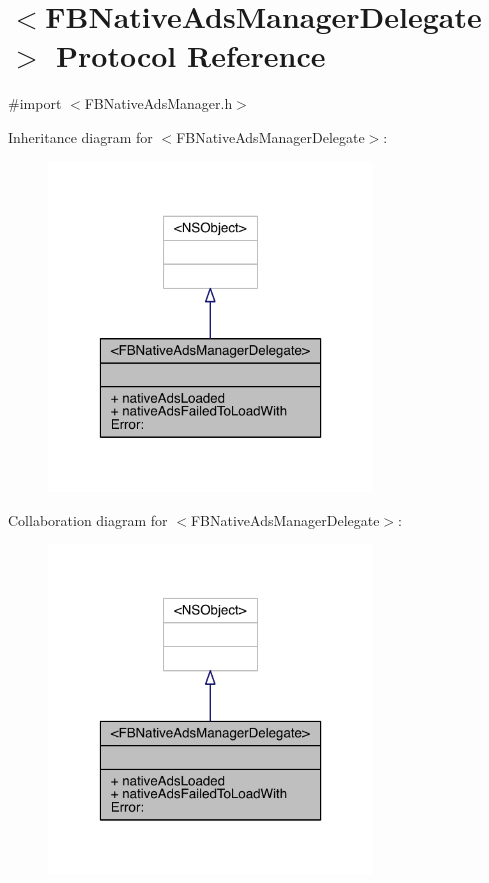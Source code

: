 \hypertarget{protocol_f_b_native_ads_manager_delegate-p}{\section{$<$F\-B\-Native\-Ads\-Manager\-Delegate$>$ Protocol Reference}
\label{protocol_f_b_native_ads_manager_delegate-p}
}


{\ttfamily \#import $<$F\-B\-Native\-Ads\-Manager.\-h$>$}



Inheritance diagram for $<$F\-B\-Native\-Ads\-Manager\-Delegate$>$\-:
\nopagebreak
\begin{figure}[H]
\begin{center}
\leavevmode
\includegraphics[width=244pt]{protocol_f_b_native_ads_manager_delegate-p__inherit__graph}
\end{center}
\end{figure}


Collaboration diagram for $<$F\-B\-Native\-Ads\-Manager\-Delegate$>$\-:
\nopagebreak
\begin{figure}[H]
\begin{center}
\leavevmode
\includegraphics[width=244pt]{protocol_f_b_native_ads_manager_delegate-p__coll__graph}
\end{center}
\end{figure}
